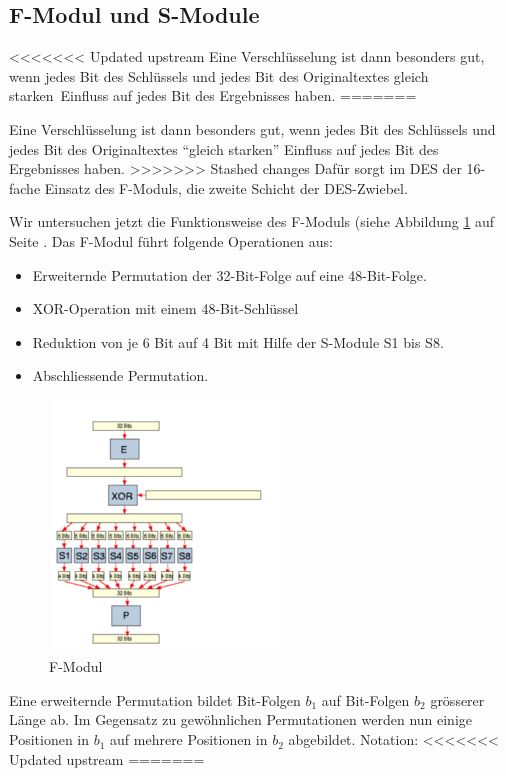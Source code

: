 \documentclass[%
<<<<<<< Updated upstream
11pt,%
twoside,%
titlepage,%
german,%
headsepline%
]{scrartcl}
\begin{document}
\subsection{F-Modul und S-Module}
<<<<<<< Updated upstream
Eine Verschlüsselung ist dann besonders gut, wenn jedes Bit des Schlüssels und jedes Bit des Originaltextes \glqq gleich starken\grqq\ Einfluss auf jedes Bit des Ergebnisses haben. 
=======

Eine Verschlüsselung ist dann besonders gut, wenn jedes Bit des Schlüssels und jedes Bit des Originaltextes \enquote{gleich starken} Einfluss auf jedes Bit des Ergebnisses haben. 
>>>>>>> Stashed changes
Dafür sorgt im DES der 16-fache Einsatz des F-Moduls, die zweite Schicht der DES-Zwiebel.

Wir untersuchen jetzt die Funktionsweise des F-Moduls (siehe Abbildung \ref{abb:fmodul} auf Seite \pageref{abb:fmodul}. Das F-Modul führt folgende Operationen aus:
\begin{itemize}
\item Erweiternde Permutation der 32-Bit-Folge auf eine 48-Bit-Folge.
\item XOR-Operation mit einem 48-Bit-Schlüssel
\item Reduktion von je 6 Bit auf 4 Bit mit Hilfe der S-Module S1 bis S8.
\item Abschliessende Permutation.
\end{itemize}

\begin{figure}
\begin{center}
\includegraphics[width=0.55\textwidth]{pictures/fmodul5}
\end{center}
\caption{F-Modul}\label{abb:fmodul}
\end{figure}

Eine erweiternde Permutation bildet Bit-Folgen $b_1$ auf Bit-Folgen $b_2$ grösserer Länge ab. Im Gegensatz zu gewöhnlichen Permutationen werden nun einige Positionen in $b_1$ auf mehrere Positionen in $b_2$ abgebildet. Notation:
<<<<<<< Updated upstream
=======
\end{document}
